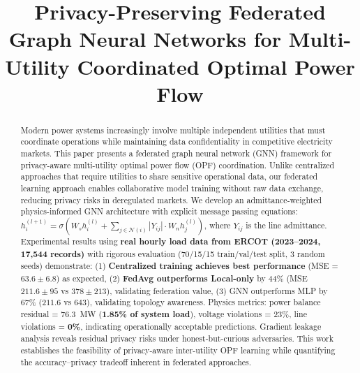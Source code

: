 \documentclass[journal,10pt]{IEEEtran}
\begin{document}
\title{Privacy-Preserving Federated Graph Neural Networks for Multi-Utility Coordinated Optimal Power Flow}

\author{
}

\maketitle

\begin{abstract}
Modern power systems increasingly involve multiple independent utilities that must coordinate operations while maintaining data confidentiality in competitive electricity markets. This paper presents a federated graph neural network (GNN) framework for privacy-aware multi-utility optimal power flow (OPF) coordination. Unlike centralized approaches that require utilities to share sensitive operational data, our federated learning approach enables collaborative model training without raw data exchange, reducing privacy risks in deregulated markets. We develop an admittance-weighted physics-informed GNN architecture with explicit message passing equations: $h_i^{(l+1)} = \sigma(W_s h_i^{(l)} + \sum_{j \in \mathcal{N}(i)} |Y_{ij}| \cdot W_n h_j^{(l)})$, where $Y_{ij}$ is the line admittance. Experimental results using \textbf{real hourly load data from ERCOT (2023--2024, 17,544 records)} with rigorous evaluation (70/15/15 train/val/test split, 3 random seeds) demonstrate: (1) \textbf{Centralized training achieves best performance} (MSE = $63.6 \pm 6.8$) as expected, (2) \textbf{FedAvg outperforms Local-only} by 44\% (MSE $211.6 \pm 95$ vs $378 \pm 213$), validating federation value, (3) GNN outperforms MLP by 67\% ($211.6$ vs $643$), validating topology awareness. Physics metrics: power balance residual = 76.3~MW (\textbf{1.85\% of system load}), voltage violations = 23\%, line violations = \textbf{0\%}, indicating operationally acceptable predictions. Gradient leakage analysis reveals residual privacy risks under honest-but-curious adversaries. This work establishes the feasibility of privacy-aware inter-utility OPF learning while quantifying the accuracy--privacy tradeoff inherent in federated approaches.
\end{abstract}
\end{document}
